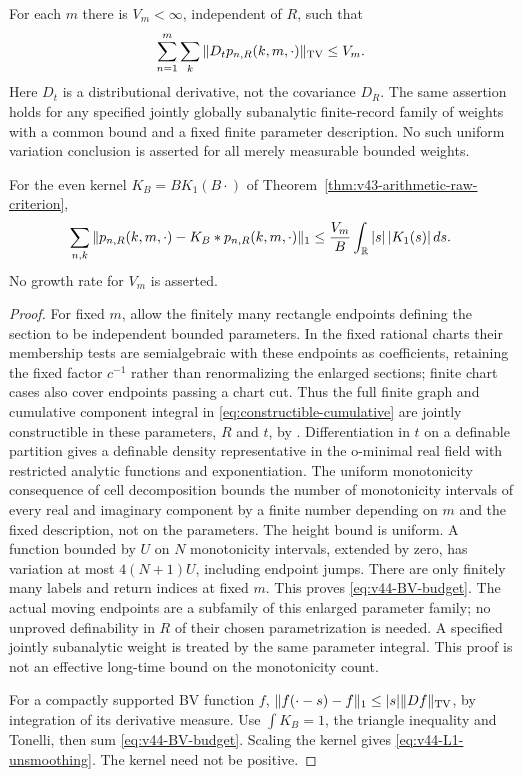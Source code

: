 \begin{proposition}
\label{prop:v44-finite-count-variation}
For each $m$ there is $V_m<\infty$, independent of $R$, such that
\begin{equation}\label{eq:v44-BV-budget}
 \sum_{n=1}^m\sum_k\|D_t p_{n,R}(k,m,\cdot)\|_{\TV}\le V_m.
\end{equation}
Here $D_t$ is a distributional derivative, not the covariance $D_R$.
The same assertion holds for any specified jointly globally subanalytic
finite-record family of weights with a common bound and a fixed finite
parameter description. No such uniform variation conclusion is asserted
for all merely measurable bounded weights.

For the even kernel $K_B=B K_1(B\cdot)$ of
Theorem~\ref{thm:v43-arithmetic-raw-criterion},
\begin{equation}\label{eq:v44-L1-unsmoothing}
 \sum_{n,k}\|p_{n,R}(k,m,\cdot)-K_B*p_{n,R}(k,m,\cdot)\|_1
       \le \frac{V_m}{B}\int_\R |s|\,|K_1(s)|\,ds.
\end{equation}
No growth rate for $V_m$ is asserted.
\end{proposition}
\begin{proof}
For fixed $m$, allow the finitely many rectangle endpoints defining the
section to be independent bounded parameters. In the fixed rational
charts their membership tests are semialgebraic with these endpoints
as coefficients, retaining the fixed factor $c^{-1}$ rather than
renormalizing the enlarged sections; finite chart cases also cover endpoints passing a
chart cut. Thus the full finite graph and cumulative component integral
in \eqref{eq:constructible-cumulative} are jointly constructible in
these parameters, $R$ and $t$, by \cite[Theorem 1.3]{CMInt}.
Differentiation in $t$ on a definable partition gives a definable density
representative in the o-minimal real field with restricted analytic
functions and exponentiation. The uniform monotonicity consequence of
cell decomposition \cite{Coste} bounds the number of monotonicity
intervals of every real and imaginary component by a finite number
depending on $m$ and the fixed description, not on the parameters.
The height bound is uniform. A function bounded by $U$ on $N$
monotonicity intervals, extended by zero, has variation at most
$4(N+1)U$, including endpoint jumps. There are only finitely many labels
and return indices at fixed $m$. This proves \eqref{eq:v44-BV-budget}.
The actual moving endpoints are a subfamily of this enlarged parameter
family; no unproved definability in $R$ of their chosen parametrization
is needed. A specified jointly subanalytic weight is treated by the
same parameter integral. This proof is not an effective long-time
bound on the monotonicity count.

For a compactly supported BV function $f$,
$\|f(\cdot-s)-f\|_1\le |s|\|Df\|_{\operatorname{TV}}$, by integration of its
derivative measure. Use $\int K_B=1$, the triangle inequality and
Tonelli, then sum \eqref{eq:v44-BV-budget}. Scaling the kernel gives
\eqref{eq:v44-L1-unsmoothing}. The kernel need not be positive.
\end{proof}


